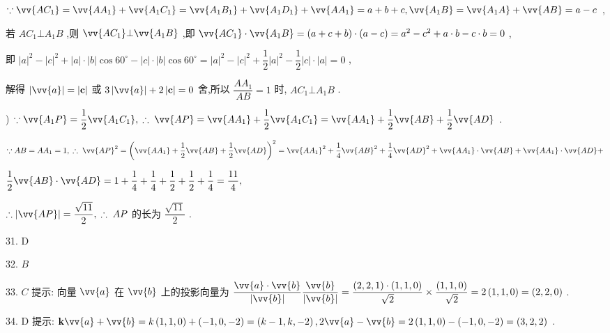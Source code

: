 $\because \vv{A{C}_{1}} = \vv{A{A}_{1}} + \vv{{A}_{1}{C}_{1}} = \vv{{A}_{1}{B}_{1}} + \vv{{A}_{1}{D}_{1}} + \vv{A{A}_{1}} = a + b + c,\vv{{A}_{1}B} = \vv{{A}_{1}A} + \vv{AB} = a - c$ ,

若 $A{C}_{1} \bot  {A}_{1}B$ ,则 $\vv{A{C}_{1}} \bot  \vv{{A}_{1}B}$ ,即 $\vv{A{C}_{1}} \cdot  \vv{{A}_{1}B} = \left( {a + c + b}\right)  \cdot  \left( {a - c}\right)  = {a}^{2} - {c}^{2} + a \cdot  b - c \cdot  b = 0$ ,

即 ${\left| a\right| }^{2} - {\left| c\right| }^{2} + \left| a\right|  \cdot  \left| b\right| \cos {60}^{ \circ  } - \left| c\right|  \cdot  \left| b\right| \cos {60}^{ \circ  } = {\left| a\right| }^{2} - {\left| c\right| }^{2} + \dfrac{1}{2}{\left| a\right| }^{2} - \dfrac{1}{2}\left| c\right|  \cdot  \left| a\right|  = 0$ ,

解得 $\left| \vv{a}\right|  = \left| \mathbf{c}\right|$ 或 $3\left| \vv{a}\right|  + 2\left| \mathbf{c}\right|  = 0$ 舍,所以 $\dfrac{A{A}_{1}}{AB} = 1$ 时, $A{C}_{1} \bot  {A}_{1}B$ .

) $\because \vv{{A}_{1}P} = \dfrac{1}{2}\vv{{A}_{1}{C}_{1}},\;\therefore \;\vv{AP} = \vv{A{A}_{1}} + \dfrac{1}{2}\vv{{A}_{1}{C}_{1}} = \vv{A{A}_{1}} + \dfrac{1}{2}\vv{AB} + \dfrac{1}{2}\vv{AD}$ .

$\because {AB} = {A{A}_{1}} = 1,\;\therefore \;{\vv{AP}}^{2} = {\left( \vv{A{A}_{1}} + \dfrac{1}{2}\vv{AB} + \dfrac{1}{2}\vv{AD}\right) }^{2} = {\vv{A{A}_{1}}}^{2} + \dfrac{1}{4}{\vv{AB}}^{2} + \dfrac{1}{4}{\vv{AD}}^{2} + \vv{A{A}_{1}} \cdot  \vv{AB} + \vv{A{A}_{1}} \cdot  \vv{AD} +$

$\dfrac{1}{2}\vv{AB} \cdot  \vv{AD} = 1 + \dfrac{1}{4} + \dfrac{1}{4} + \dfrac{1}{2} + \dfrac{1}{2} + \dfrac{1}{4} = \dfrac{11}{4},$

$\therefore \left| \vv{AP}\right|  = \dfrac{\sqrt{11}}{2},\;\therefore \;{AP}$ 的长为 $\dfrac{\sqrt{11}}{2}$ .

31. D

32. $B$

33. $C$ 提示: 向量 $\vv{a}$ 在 $\vv{b}$ 上的投影向量为 $\dfrac{\vv{a} \cdot  \vv{b}}{\left| \vv{b}\right| }\dfrac{\vv{b}}{\left| \vv{b}\right| } = \dfrac{\left( {2,2,1}\right)  \cdot  \left( {1,1,0}\right) }{\sqrt{2}} \times  \dfrac{\left( 1,1,0\right) }{\sqrt{2}} = 2\left( {1,1,0}\right)  = \left( {2,2,0}\right)$ .

34. D 提示: $\mathbf{k}\vv{a} + \vv{b} = k\left( {1,1,0}\right)  + \left( {-1,0, - 2}\right)  = \left( {k - 1,k, - 2}\right) ,2\vv{a} - \vv{b} = 2\left( {1,1,0}\right)  - \left( {-1,0, - 2}\right)  = \left( {3,2,2}\right)$ .

